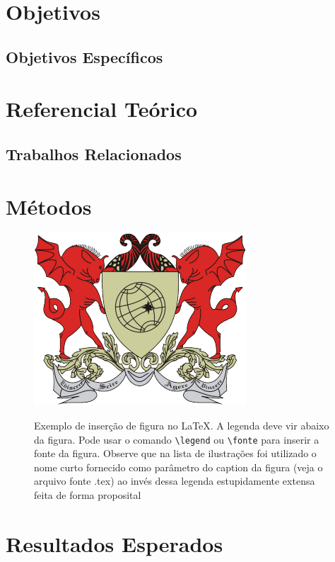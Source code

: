 \documentclass[
	12pt,				    %
	openright,			    %
	oneside,			    %
	a4paper,			    %
    sumario=tradicional,    %
	english,			    %
	brazil,				    %
	]{abntex2}              %
\begin{document}
\chapter{Objetivos}\label{sec:objetivos}

\section{Objetivos Específicos}\label{sec:ObjetivosEspec}

\chapter{Referencial Teórico}\label{sec:RefTeorico}

\section{Trabalhos Relacionados}\label{sec:TrabRel}

\chapter{Métodos}\label{sec:metodos}
\begin{figure}[htbp]
  \begin{center}
  \includegraphics[width=.5\linewidth]{logoufv}\\
  \end{center}
  \caption[Exemplo de Figura]{Exemplo de inserção de figura no \LaTeX. A legenda deve vir abaixo da figura. Pode usar o comando \texttt{\textbackslash legend} ou \texttt{\textbackslash fonte} para inserir a fonte da figura. Observe que na lista de ilustrações foi utilizado o nome curto fornecido como parâmetro do caption da figura (veja o arquivo fonte .tex) ao invés dessa legenda estupidamente extensa feita de forma proposital}
  \label{fig:logo}
\end{figure}

\chapter{Resultados Esperados}\label{sec:resultEsperados}
\end{document}
